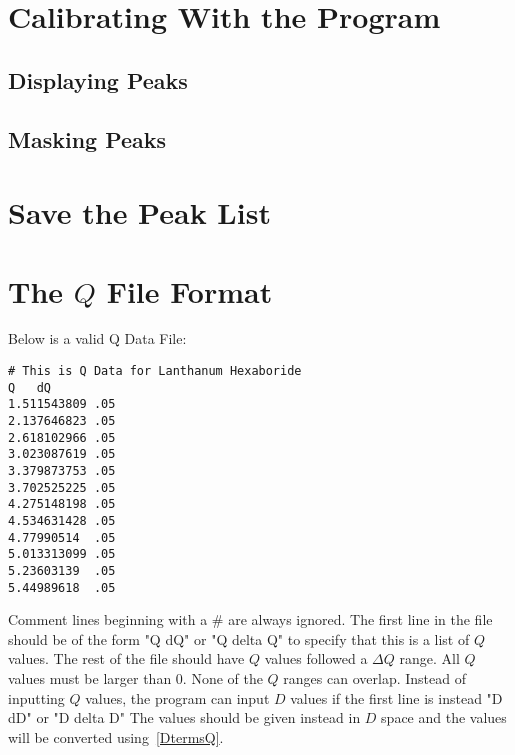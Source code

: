 \section{Calibrating With the Program}

\subsection{Displaying Peaks}

\subsection{Masking Peaks}

\section{Save the Peak List}

\section{\texorpdfstring{The $Q$ File Format}{The Q File Format}}
\label{TheQValues}
Below is a valid Q Data File:
\begin{lstlisting}[caption={Lanthanum Hexaboride.dat},label=LaB6]
# This is Q Data for Lanthanum Hexaboride
Q   dQ
1.511543809 .05
2.137646823 .05
2.618102966 .05
3.023087619 .05
3.379873753 .05
3.702525225 .05
4.275148198 .05
4.534631428 .05
4.77990514  .05
5.013313099 .05
5.23603139  .05
5.44989618  .05
\end{lstlisting}
Comment lines beginning with a \# are always ignored. The
first line in the file should be of the form "Q  dQ" or "Q  delta Q" 
to specify that this is a list of $Q$ values. The rest of the
file should have $Q$ values followed a $\Delta Q$ range.
All $Q$ values must be larger than 0. None of the $Q$ ranges can 
overlap. Instead of inputting $Q$ values, the program can input
$D$ values if the first line is instead "D dD" or "D delta D"
The values should be given instead in $D$ space and the values
will be converted using~\ref{DtermsQ}.


